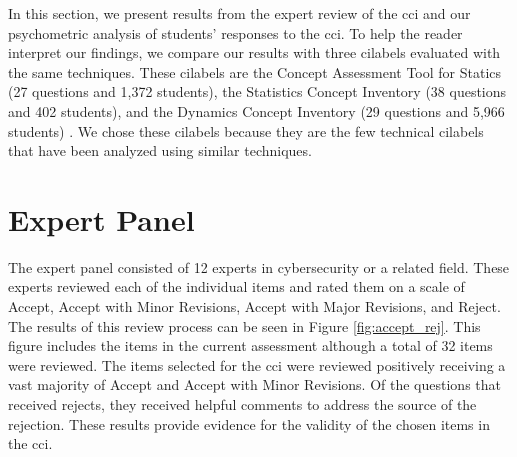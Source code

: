 

In this section, we present results from the expert review of the \gls{cci} and our psychometric analysis of students' responses to the \gls{cci}. To help the reader interpret our findings, we compare our results with three \glspl{cilabel} evaluated with the same techniques. These \glspl{cilabel} are the Concept Assessment Tool for Statics (27 questions and 1,372 students), the Statistics Concept Inventory (38 questions and 402 students), and the Dynamics Concept Inventory (29 questions and 5,966 students) \cite{jorian}. We chose these \glspl{cilabel} because they are the few technical \glspl{cilabel} that have been analyzed using similar techniques.






\section{Expert Panel}

The expert panel consisted of 12 experts in cybersecurity or a related field. These experts reviewed each of the individual items and rated them on a scale of Accept, Accept with Minor Revisions, Accept with Major Revisions, and Reject. The results of this review process can be seen in Figure \ref{fig:accept_rej}. This figure includes the items in the current assessment although a total of 32 items were reviewed. The items selected for the \gls{cci} were reviewed positively receiving a vast majority of Accept and Accept with Minor Revisions. Of the questions that received rejects, they received helpful comments to address the source of the rejection. These results provide evidence for the validity of the chosen items in the \gls{cci}.

